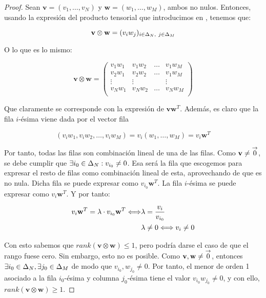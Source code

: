\begin{proof}

Sean $\mathbf{v} = (v_1, \ldots, v_N)$ y $\mathbf{w} = (w_1, \ldots, w_M)$, ambos no nulos. Entonces, usando la expresión del producto tensorial que introducimos en , tenemos que:

\begin{equation}
    \mathbf{v} \otimes \mathbf{w} = (v_i w_j)_{i \in \Delta_{N},\ j \in \Delta_{M}}
\end{equation}

O lo que es lo mismo:

\begin{equation}
    \mathbf{v} \otimes \mathbf{w} = \begin{pmatrix}
        v_1 w_1 & v_1 w_2 & \ldots & v_1 w_M \\
        v_2 w_1 & v_2 w_2 & \ldots & v_1 w_M \\
        \vdots  & \vdots & & \vdots \\
        v_N w_1 & v_N w_2 & \ldots & v_N w_M \\
    \end{pmatrix}
\end{equation}

Que claramente se corresponde con la expresión de $\mathbf{v} \mathbf{w}^T$. Además, es claro que la fila $i$-ésima viene dada por el vector fila

$$(v_i w_1, v_i w_2, \ldots, v_i w_M) = v_i (w_1, \ldots, w_M) = v_i \mathbf{w}^T$$

Por tanto, todas las filas son combinación lineal de una de las filas. Como $\mathbf{v} \neq \overset{\to}{0}$, se debe cumplir que $\exists i_0 \in \Delta_{N}: v_{i_0} \neq 0$. Esa será la fila que escogemos para expresar el resto de filas como combinación lineal de esta, aprovechando de que es no nula. Dicha fila se puede expresar como $v_{i_0} \mathbf{w}^T$. La fila $i$-ésima se puede expresar como $v_i \mathbf{w}^T$. Y por tanto:

\begin{equation}
\begin{split}
    v_i \mathbf{w}^T = \lambda \cdot v_{i_0} \mathbf{w}^T \Longleftrightarrow & \lambda = \frac{v_i}{v_{i_0}} \\
                                                               & \lambda \neq 0 \Longleftrightarrow v_i \neq 0
\end{split}
\end{equation}

Con esto sabemos que $rank(\mathbf{v} \otimes \mathbf{w}) \leq 1$, pero podría darse el caso de que el rango fuese cero. Sin embargo, esto no es posible. Como $\mathbf{v}, \mathbf{w} \neq \overset{\to}{0}$, entonces $\exists i_0 \in \Delta_{N}, \exists j_0 \in \Delta_{M}$ de modo que $v_{i_0}, w_{j_0} \neq 0$. Por tanto, el menor de orden 1 asociado a la fila $i_0$-ésima y columna $j_0$-ésima tiene el valor $v_{i_0} w_{j_0} \neq 0$, y con ello, $rank(\mathbf{v} \otimes \mathbf{w}) \geq 1$.

\end{proof}

